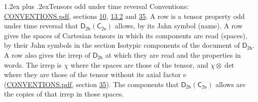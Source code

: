 \documentclass[10pt,a4paper]{article}
\makeatletter
\renewcommand\section{\@startsection{section}{1}{\z@}{-3ex plus -1ex minus -.2ex}%
  {1.2ex plus .2ex}{\normalfont\large\sffamily\bfseries\color{parttitle}}}
\numberwithin{equation}{section}
\newcommand{\grp}[1]{\mathsf{#1}}
\newcommand{\irrprod}{\otimes}
\makeatother
\begin{document}
\section{Tensors odd under time reversal}\label{s:time_odd}
Conventions: \href{../../CONVENTIONS.pdf}{CONVENTIONS.pdf}, sections \href{../../../rotation/CONVENTIONS.pdf\#conv.10}{10}, \href{../../../rotation/CONVENTIONS.pdf\#conv.13.2}{13.2} and \href{../../CONVENTIONS.pdf\#conv.35}{35}.
\leavevmode\label{n:head.name.property}A row is a tensor property odd under time reversal that $\grp{D_{2h}}(\grp{C_{2v}})$ allows, by its Jahn symbol (name). \label{n:head.spaces}A row gives the spaces of Cartesian tensors in which its components are read (spaces), by their Jahn symbols in the section Isotypic components of the document of \href{../../../rotation/data/pdf/D2h.pdf}{$\grp{D_{2h}}$}. \label{n:head.properties}A row also gives the irrep of $\grp{D_{2h}}$ at which they are read and the properties in words. The irrep is $\chi$ where the spaces are those of the tensor, and $\chi \irrprod \det$ where they are those of the tensor without its axial factor e (\href{../../CONVENTIONS.pdf}{CONVENTIONS.pdf}, section \href{../../CONVENTIONS.pdf\#conv.35}{35}). The components that $\grp{D_{2h}}(\grp{C_{2v}})$ allows are the copies of that irrep in those spaces.
\end{document}
